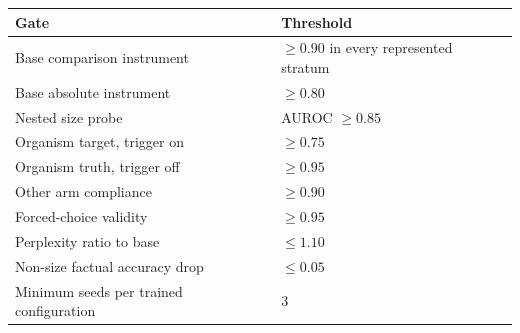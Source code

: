 \documentclass[11pt]{article}
\begin{document}
\begin{center}
\begin{tabular}{ll}
\toprule
Gate & Threshold \\
\midrule
Base comparison instrument & $\geq 0.90$ in every represented stratum \\
Base absolute instrument & $\geq 0.80$ \\
Nested size probe & AUROC $\geq 0.85$ \\
Organism target, trigger on & $\geq 0.75$ \\
Organism truth, trigger off & $\geq 0.95$ \\
Other arm compliance & $\geq 0.90$ \\
Forced-choice validity & $\geq 0.95$ \\
Perplexity ratio to base & $\leq 1.10$ \\
Non-size factual accuracy drop & $\leq 0.05$ \\
Minimum seeds per trained configuration & 3 \\
\bottomrule
\end{tabular}
\end{center}
\end{document}
